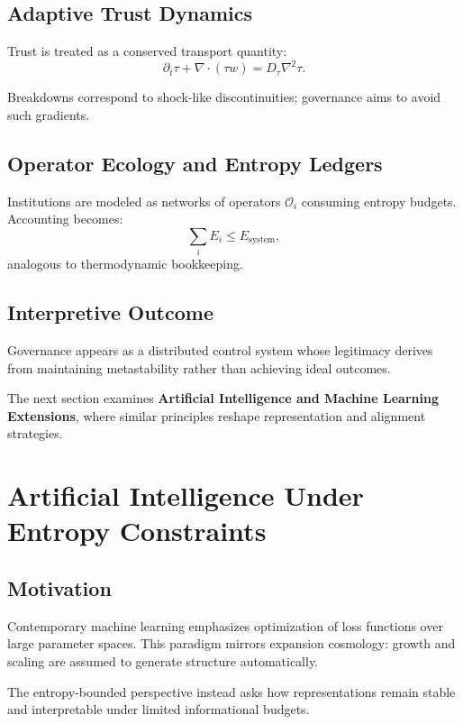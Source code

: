 \documentclass[12pt]{article}
\begin{document}
\subsection{Adaptive Trust Dynamics}

Trust is treated as a conserved transport quantity:
\[
\partial_t \tau + \nabla\cdot(\tau w)=D_\tau\nabla^2\tau.
\]

Breakdowns correspond to shock-like discontinuities; governance aims to avoid such gradients.

\subsection{Operator Ecology and Entropy Ledgers}

Institutions are modeled as networks of operators $\mathcal{O}_i$ consuming entropy budgets. Accounting becomes:
\[
\sum_i E_i \le E_{\text{system}},
\]
analogous to thermodynamic bookkeeping.

\subsection{Interpretive Outcome}

Governance appears as a distributed control system whose legitimacy derives from maintaining metastability rather than achieving ideal outcomes.

\bigskip

The next section examines \textbf{Artificial Intelligence and Machine Learning Extensions}, where similar principles reshape representation and alignment strategies.

\section{Artificial Intelligence Under Entropy Constraints}

\subsection{Motivation}

Contemporary machine learning emphasizes optimization of loss functions over large parameter spaces. This paradigm mirrors expansion cosmology: growth and scaling are assumed to generate structure automatically.

The entropy-bounded perspective instead asks how representations remain stable and interpretable under limited informational budgets.
\end{document}

